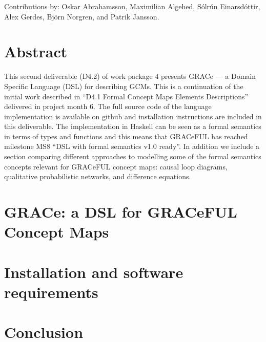 \documentclass[]{article}
\begin{document}
Contributions by: Oskar Abrahamsson, Maximilian Algehed, Sólrún
Einarsdóttir, Alex Gerdes, Björn Norgren, and Patrik Jansson.

\vfill

\setcounter{tocdepth}{2}
\tableofcontents

\vfill

\newpage

\section*{Abstract}\label{abstract}

This second deliverable (D4.2) of work package 4 presents GRACe --- a
Domain Specific Language (DSL) for describing \acp{GCM}.
%
This is a continuation of the initial work described in ``D4.1 Formal
Concept Maps Elements Descriptions'' delivered in project month 6.
%
The full source code of the language implementation is available on
github and installation instructions are included in this deliverable.
%
The implementation in Haskell can be seen as a formal semantics in
terms of types and functions and this means that GRACeFUL has reached
milestone MS8 ``DSL with formal semantics v1.0 ready''.
%
In addition we include a section comparing different approaches to
modelling some of the formal semantics concepts relevant for GRACeFUL
concept maps: causal loop diagrams, qualitative probabilistic
networks, and difference equations.





\section{GRACe: a DSL for GRACeFUL Concept Maps}
\label{sec:gl}





\section{Installation and software requirements}
\label{install-and-reqs}






\section{Conclusion}
\end{document}
